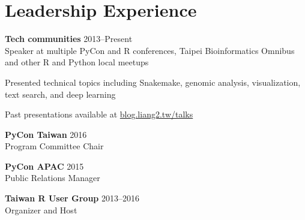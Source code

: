 \section{Leadership Experience}

\begin{entrylist}

\item \textbf{Tech communities} \hfill 2013--Present\\
\small Speaker at multiple PyCon and R conferences, Taipei Bioinformatics Omnibus and other R and Python local meetups
\begin{detaillist}[leftmargin=*, labelsep=0.4em]
    \item Presented technical topics including Snakemake, genomic analysis, visualization, text search, and deep learning
    \item Past presentations available at \href{https://blog.liang2.tw/talks/}{blog.liang2.tw/talks}
\end{detaillist}

\item \normalsize \textbf{PyCon Taiwan} \hfill 2016\\
Program Committee Chair

\item \textbf{PyCon APAC} \hfill 2015\\
Public Relations Manager

\item \textbf{Taiwan R User Group}\hfill
    2013--2016\\
Organizer and Host
\end{entrylist}
